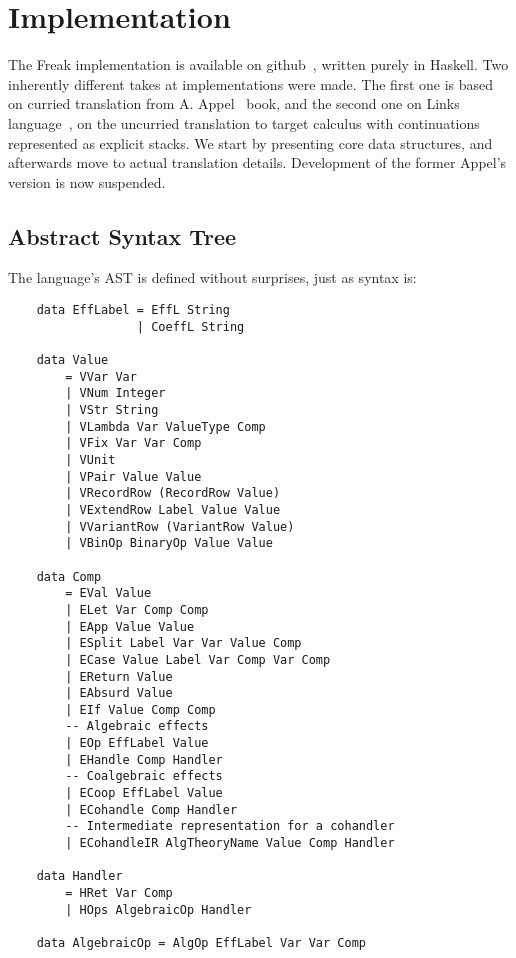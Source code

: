 \documentclass[declaration,shortabstract]{iithesis}
\theoremstyle{definition} \newtheorem{definition}{Definition}[chapter]
\theoremstyle{remark} \newtheorem{remark}[definition]{Observation}
\theoremstyle{plain} \newtheorem{theorem}[definition]{Theorem}
\theoremstyle{plain} \newtheorem{lemma}[definition]{Lemma}
\begin{document}
\chapter{Implementation}\label{chapter:implementation}

    The Freak implementation is available on github~\cite{freak}, written purely
    in Haskell. Two inherently different takes at implementations were made. The
    first one is based on curried translation from A. Appel~\cite{appel-continuations}
    book, and the second one on Links language~\cite{handlers-cps, handlers-cps-journal},
    on the uncurried translation to target calculus with continuations represented
    as explicit stacks. We start by presenting core data structures, and
    afterwards move to actual translation details. Development of the former
    Appel's version is now suspended.

    \section{Abstract Syntax Tree}\label{sec:implementation-ast}

    The language's AST is defined without surprises, just as syntax is:

\begin{verbatim}
    data EffLabel = EffL String
                  | CoeffL String

    data Value
        = VVar Var
        | VNum Integer
        | VStr String
        | VLambda Var ValueType Comp
        | VFix Var Var Comp
        | VUnit
        | VPair Value Value
        | VRecordRow (RecordRow Value)
        | VExtendRow Label Value Value
        | VVariantRow (VariantRow Value)
        | VBinOp BinaryOp Value Value

    data Comp
        = EVal Value
        | ELet Var Comp Comp
        | EApp Value Value
        | ESplit Label Var Var Value Comp
        | ECase Value Label Var Comp Var Comp
        | EReturn Value
        | EAbsurd Value
        | EIf Value Comp Comp
        -- Algebraic effects
        | EOp EffLabel Value
        | EHandle Comp Handler
        -- Coalgebraic effects
        | ECoop EffLabel Value
        | ECohandle Comp Handler
        -- Intermediate representation for a cohandler
        | ECohandleIR AlgTheoryName Value Comp Handler

    data Handler
        = HRet Var Comp
        | HOps AlgebraicOp Handler

    data AlgebraicOp = AlgOp EffLabel Var Var Comp
\end{verbatim}
\end{document}
